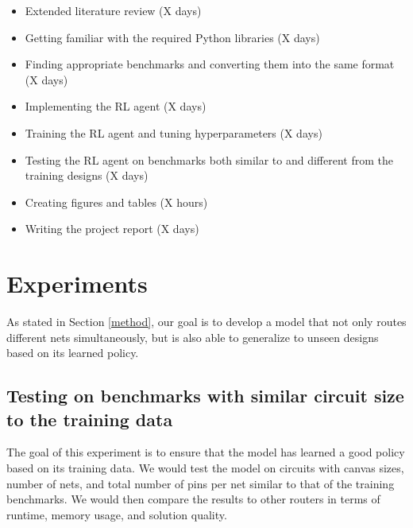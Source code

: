 \documentclass[letterpaper]{article}
\begin{document}
    \begin{itemize}
        \item Extended literature review (X days)
        
        \item Getting familiar with the required Python libraries (X days)
        
        \item Finding appropriate benchmarks and converting them into the same format (X days)
        
        \item Implementing the RL agent (X days)
        
        \item Training the RL agent and tuning hyperparameters (X days)
        
        \item Testing the RL agent on benchmarks both similar to and different from the training designs (X days)
        
        \item Creating figures and tables (X hours)
        
        \item Writing the project report (X days)
    \end{itemize}
    
    
\section{Experiments}


    As stated in Section \ref{method}, our goal is to develop a model that not only routes different nets simultaneously, but is also able to generalize to unseen designs based on its learned policy.
    
    
\subsection{Testing on benchmarks with similar circuit size to the training data}

    The goal of this experiment is to ensure that the model has learned a good policy based on its training data. We would test the model on circuits with canvas sizes, number of nets, and total number of pins per net similar to that of the training benchmarks. We would then compare the results to other routers in terms of runtime, memory usage, and solution quality.
    
\end{document}
